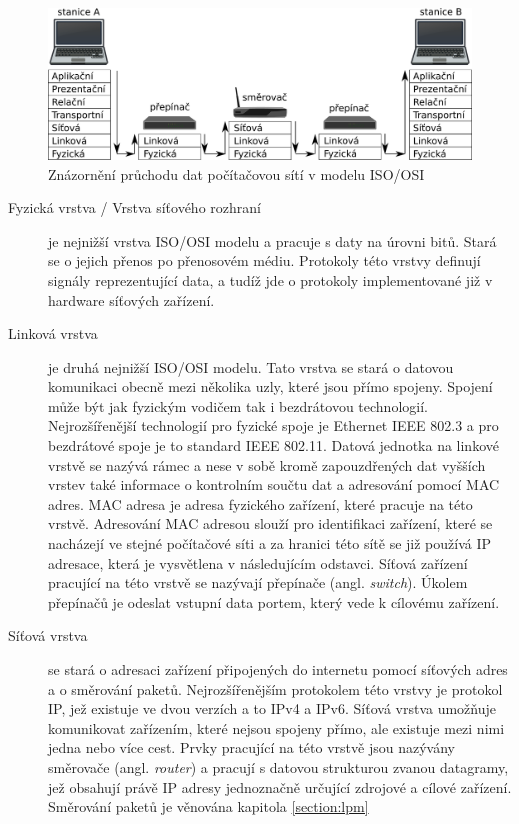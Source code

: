 \begin{figure}[!htbp]
	\centering
	\includegraphics[scale=.25]{fig/layers.pdf}
	\caption{Znázornění průchodu dat počítačovou sítí v modelu ISO/OSI}
    \label{fig:layers}
\end{figure}

\begin{description}
\item[Fyzická vrstva / Vrstva síťového rozhraní]\label{layers:physical} %
je nejnižší vrstva ISO/OSI modelu a pracuje s daty na úrovni bitů. Stará se o
jejich přenos po přenosovém médiu. Protokoly této vrstvy definují signály reprezentující data,
a tudíž jde o protokoly implementované již v hardware síťových zařízení.

\item[Linková vrstva]\label{layers:link} %
je druhá nejnižší ISO/OSI modelu. Tato vrstva se stará o datovou komunikaci
obecně mezi několika uzly, které jsou přímo spojeny. Spojení může být jak fyzickým vodičem tak i
bezdrátovou technologií. Nejrozšířenější technologií pro fyzické spoje je Ethernet IEEE 802.3 a pro bezdrátové spoje
je to standard IEEE 802.11. Datová jednotka na linkové vrstvě se nazývá rámec a nese v sobě kromě
zapouzdřených dat vyšších vrstev také informace o kontrolním součtu dat a adresování pomocí MAC adres.
MAC adresa je adresa fyzického zařízení, které pracuje na této vrstvě.
Adresování MAC adresou slouží pro identifikaci zařízení, které se nacházejí ve stejné počítačové síti
a za hranici této sítě se již používá IP adresace, která je vysvětlena v následujícím odstavci.
Síťová zařízení pracující na této vrstvě se nazývají přepínače (angl. \textit{switch}).
Úkolem přepínačů je odeslat vstupní data portem, který vede k cílovému zařízení.

\item[Síťová vrstva]\label{layers:network} %
se stará o adresaci zařízení připojených do internetu pomocí síťových adres a o směrování paketů.
Nejrozšířenějším protokolem této vrstvy je protokol IP, jež existuje ve dvou verzích a to IPv4 a IPv6.
Síťová vrstva umožňuje komunikovat zařízením, které nejsou spojeny přímo, ale existuje mezi nimi jedna nebo více cest.
Prvky pracující na této vrstvě jsou nazývány směrovače (angl. \textit{router}) a pracují s datovou strukturou zvanou
datagramy, jež obsahují právě IP adresy jednoznačně určující zdrojové a cílové zařízení. Směrování paketů
je věnována kapitola \ref{section:lpm}


\end{description}
